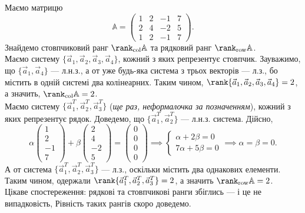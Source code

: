 \documentclass{math_library}
\begin{document}
\begin{example}
Маємо матрицю \[
\mathbb{A} = \begin{pmatrix}
1 & 2 & -1 & 7 \\
2 & 4 & -2 & 5 \\
1 & 2 & -1 & 7
\end{pmatrix}.
\]
Знайдемо стовпчиковий ранг $\rank_{\textrm{col}} \mathbb{A}$ та рядковий ранг $\rank_{\textrm{row}} \mathbb{A}$.
\bigskip \\
Маємо систему $\{\vec{a}_1,\vec{a}_2,\vec{a}_3,\vec{a}_4 \}$, кожний з яких репрезентує стовпчик. Зауважимо, що $\{\vec{a}_1, \vec{a}_4 \}$ --- л.н.з., а от уже будь-яка система з трьох векторів --- л.з., бо містить в одній системі два колінеарних. Таким чином, $\rank \{\vec{a}_1,\vec{a}_2,\vec{a}_3,\vec{a}_4\} = 2$, а значить, $\rank_{\text{col}} \mathbb{A} = 2$.
\bigskip \\
Маємо систему $\{\vec{a}_1^T,\vec{a}_2^T,\vec{a}_3^T \}$ (\textit{ще раз, неформалочка за позначенням}), кожний з яких репрезентує рядок. Доведемо, що $\{\vec{a}_1^T,\vec{a}_2^T \}$ --- л.н.з. система. Дійсно,
\[
\alpha\begin{pmatrix}
1 \\ 2 \\ -1 \\ 7
\end{pmatrix} + \beta \begin{pmatrix}
2 \\ 4 \\ -2 \\ 5
\end{pmatrix} = \begin{pmatrix}
0 \\ 0 \\ 0 \\ 0
\end{pmatrix} \implies \begin{cases} \alpha + 2\beta = 0 \\ 7\alpha + 5\beta = 0 \end{cases} \implies \alpha=\beta = 0.
\]
А от система $\{\vec{a}_1^T,\vec{a}_2^T,\vec{a}_3^T \}$ --- л.з., оскільки містить два однакових елементи. Таким чином, одержали $\rank\{\vec{a}_1^T,\vec{a}_2^T,\vec{a}_3^T \} = 2$, а значить $\rank_{\text{row}} \mathbb{A} = 2$.
\bigskip \\
Цікаве спостереження: рядкові та стовпчикові ранги збіглись --- і це не випадковість, Рівність таких рангів скоро доведемо.
\end{example}
\end{document}

